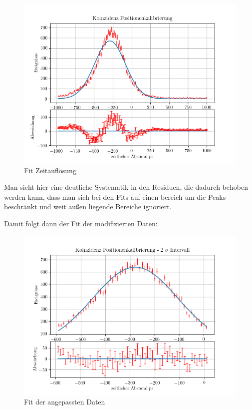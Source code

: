 \documentclass[12pt,twoside,a4paper]{scrartcl}
\begin{document}
					\begin{figure}[H]
						\centering

							\includegraphics[width=\textwidth]{Plots/Time/Positionenkalibrierung.png}

						\caption{Fit Zeitauflösung}
					\end{figure}

					Man sieht hier eine deutliche Systematik in den Residuen, die dadurch behoben werden kann, dass man sich bei den Fits auf einen bereich um die Peaks beschränkt und weit außen liegende Bereiche ignoriert.

					Damit folgt dann der Fit der modifizierten Daten:

					\begin{figure}[H]
						\centering
							\includegraphics{Plots/Time/SelPositionenkalibrierung.png}
						\caption{Fit der angepassten Daten}
					\end{figure}
\end{document}
